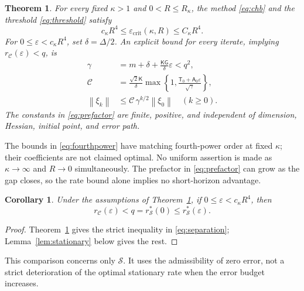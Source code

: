 \documentclass[pdflatex,sn-mathphys-num]{sn-jnl}
\theoremstyle{thmstyleone}
\newtheorem{theorem}{Theorem}
\newtheorem{corollary}{Corollary}
\theoremstyle{thmstyletwo}
\newcommand{\crit}{\mathrm{crit}}
\newcommand{\cT}{\mathsf T}
\newcommand{\cK}{\mathsf K}
\newcommand{\cG}{\mathsf G}
\newcommand{\norm}[1]{\left\lVert #1\right\rVert}
\begin{document}
\begin{theorem}\label{thm:main}
For every fixed $\kappa>1$ and $0<R\leq R_\kappa$, the method
\eqref{eq:chb} and the threshold \eqref{eq:threshold} satisfy
\begin{equation}\label{eq:fourthpower}
 c_\kappa R^4\leq\varepsilon_{\crit}(\kappa,R)\leq C_\kappa R^4 .
\end{equation}
For $0\leq\varepsilon<c_\kappa R^4$, set $\delta=\Delta/2$.
An explicit bound for every iterate, implying
$r_{\mathcal C}(\varepsilon)<q$, is
\begin{equation}\label{eq:prefactor}
\begin{split}
 \gamma&=m+\delta+\frac{\cK\cG}{\delta}\varepsilon<q^2,\\
 \mathcal C&=\frac{\sqrt2\cK}{\delta}
     \max\left\{1,\frac{\cT_0+\mathsf A_0\varepsilon}{\sqrt\gamma}\right\},\\
 \norm{\xi_k}&\leq\mathcal C\,\gamma^{k/2}\norm{\xi_0}
 \quad(k\geq0).
\end{split}
\end{equation}
The constants in \eqref{eq:prefactor} are finite, positive, and
independent of dimension, Hessian, initial point, and error path.
\end{theorem}

The bounds in \eqref{eq:fourthpower} have matching fourth-power order
at fixed $\kappa$; their coefficients are not claimed optimal.
No uniform assertion is made as $\kappa\to\infty$ and $R\to0$
simultaneously. The prefactor in \eqref{eq:prefactor} can grow as the
gap closes, so the rate bound alone implies no short-horizon advantage.

\begin{corollary}\label{cor:comparison}
Under the assumptions of Theorem~\ref{thm:main}, if
$0\leq\varepsilon<c_\kappa R^4$, then
\begin{equation}\label{eq:separation}
 r_{\mathcal C}(\varepsilon)<q=r_{\mathcal S}^*(0)
     \leq r_{\mathcal S}^*(\varepsilon).
\end{equation}
\end{corollary}
\begin{proof}
Theorem~\ref{thm:main} gives the strict inequality in
\eqref{eq:separation}; Lemma~\ref{lem:stationary} below gives the rest.
\end{proof}
This comparison concerns only $\mathcal S$. It uses the admissibility
of zero error, not a strict deterioration of the optimal stationary
rate when the error budget increases.
\end{document}
